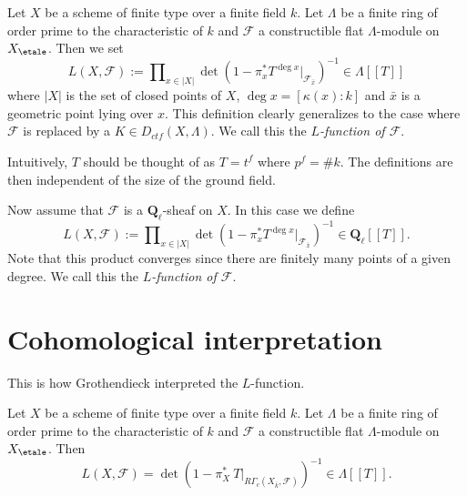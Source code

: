 \begin{definition}
\label{definition-L-function-finite-ring}
Let $X$ be a scheme of finite type over a finite field $k$. Let $\Lambda$ be a
finite ring of order prime to the characteristic of $k$ and $\mathcal{F}$ a
constructible flat $\Lambda$-module on $X_\etale$. Then we set
$$
L(X, \mathcal{F}) :=
\prod\nolimits_{x\in |X|}
\det(1 - \pi_x^*T^{\deg x} |_{\mathcal{F}_{\bar x}})^{-1} \in \Lambda [[ T ]]
$$
where $|X|$ is the set of closed points of $X$, $\deg x = [\kappa(x): k]$ and
$\bar x$ is a geometric point lying over $x$. This definition clearly
generalizes to the case where $\mathcal{F}$ is replaced by a
$K \in D_{ctf}(X, \Lambda)$. We call this the {\it $L$-function of
$\mathcal{F}$}.
\end{definition}

\begin{remark}
\label{remark-T}
Intuitively, $T$ should be thought of as $T = t^f$ where $p^f = \# k$. The
definitions are then independent of the size of the ground field.
\end{remark}

\begin{definition}
\label{definition-L-function-l-adic}
Now assume that $\mathcal{F}$ is a $\mathbf{Q}_\ell$-sheaf on $X$.
In this case we define
$$
L(X, \mathcal{F}) :=
\prod\nolimits_{x \in |X|}
\det(1 - \pi_x^*T^{\deg x} |_{\mathcal{F}_{\bar x}})^{-1}
\in \mathbf{Q}_\ell[[T]].
$$
Note that this product converges since there are finitely many points of a
given degree. We call this the {\it $L$-function of
$\mathcal{F}$}.
\end{definition}




\section{Cohomological interpretation}
\label{section-L-cohomological}

\noindent
This is how Grothendieck interpreted the $L$-function.

\begin{theorem}
\label{theorem-A}
Let $X$ be a scheme of finite type over a finite field $k$. Let $\Lambda$ be a
finite ring of order prime to the characteristic of $k$ and $\mathcal{F}$ a
constructible flat $\Lambda$-module on $X_\etale$. Then
$$
L(X, \mathcal{F}) =
\det(1 - \pi_X^*\ T |_{R\Gamma_c(X_{\bar k}, \mathcal{F})})^{-1}
\in \Lambda[[T]].
$$
\end{theorem}

